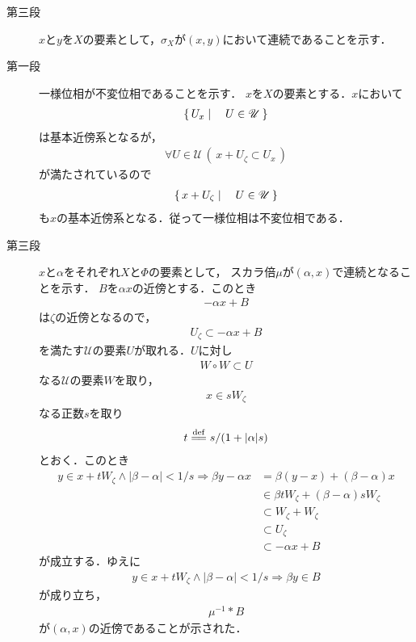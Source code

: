 \begin{sketch}
\begin{description}
			\item[第三段] $x$と$y$を$X$の要素として，$\sigma_X$が$\left(x,y\right)$において連続であることを示す．
				
			\item[第一段] 一様位相が不変位相であることを示す．
				$x$を$X$の要素とする．$x$において
				\begin{align}
					\left\{\, U_x \mid \quad U \in \mathscr{U}\, \right\}
				\end{align}
				は基本近傍系となるが，
				\begin{align}
					\forall U \in \mathscr{U}\, \left(\, x + U_\zeta \subset U_x\, \right)
				\end{align}
				が満たされているので
				\begin{align}
					\left\{\, x + U_\zeta \mid \quad U \in \mathscr{U}\, \right\}
				\end{align}
				も$x$の基本近傍系となる．従って一様位相は不変位相である．
				
			\item[第三段]
				$x$と$\alpha$をそれぞれ$X$と$\Phi$の要素として，
				スカラ倍$\mu$が$(\alpha,x)$で連続となることを示す．
				$B$を$\alpha x$の近傍とする．このとき
				\begin{align}
					-\alpha x + B
				\end{align}
				は$\zeta$の近傍となるので，
				\begin{align}
					U_\zeta \subset -\alpha x + B 
				\end{align}
				を満たす$\mathscr{U}$の要素$U$が取れる．$U$に対し
				\begin{align}
					W \circ W \subset U
				\end{align}
				なる$\mathscr{U}$の要素$W$を取り，
				\begin{align}
					x \in s W_\zeta
				\end{align}
				なる正数$s$を取り
				\begin{align}
					t \defeq s/(1+|\alpha|s)
				\end{align}
				とおく．このとき
				\begin{align}
					y \in x+t W_\zeta \wedge |\beta - \alpha| < 1/s
					\Longrightarrow \beta y - \alpha x
					&= \beta (y-x) + (\beta - \alpha)x \\
					&\in \beta t W_\zeta + (\beta - \alpha) s W_\zeta \\
					&\subset W_\zeta + W_\zeta \\
					&\subset U_\zeta \\
					&\subset -\alpha x + B
				\end{align}
				が成立する．ゆえに
				\begin{align}
					y \in x+t W_\zeta \wedge |\beta - \alpha| < 1/s
					\Longrightarrow \beta y \in B
				\end{align}
				が成り立ち，
				\begin{align}
					\mu^{-1} \ast B
				\end{align}
				が$(\alpha,x)$の近傍であることが示された．
				
		\end{description}
	\end{sketch}
	

